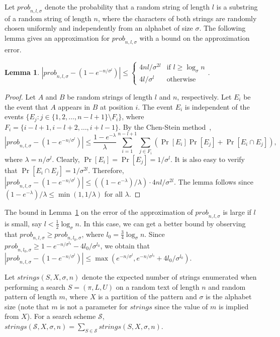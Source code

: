 \documentclass[12pt]{article}
\newtheorem{lemma}[theorem]{Lemma}
\newcommand{\scheme}{\mathcal{S}}
\newcommand{\partition}{X}
\newcommand{\numstrings}{\mathit{strings}}
\newcommand{\prob}[2]{\mathit{prob}_{#1,#2,\sigma}}
\begin{document}
Let $\prob{n}{l}$ denote the probability that a random string of length $l$
is a substring of a random string of length $n$, where the characters
of both strings are randomly chosen uniformly and independently
from an alphabet of size $\sigma$.
The following lemma gives an approximation for $\prob{n}{l}$ with
a bound on the approximation error.
\begin{lemma}\label{lem:substring-probability}
$|\prob{n}{l} - (1-e^{-n/\sigma^l})| \leq
\begin{cases}
 4nl/\sigma^{2l} & \text{if }l \geq \log_{\sigma} n \\
4l/\sigma^l & \text{otherwise}
\end{cases}$.
\end{lemma}
\begin{proof}
Let $A$ and $B$ be random strings of length $l$ and $n$, respectively.
Let $E_i$ be the event that $A$ appears in $B$ at position $i$.
The event $E_i$ is independent of the events
$\{E_j: j \in \{1,2,\ldots,n-l+1\} \setminus F_i\}$, where
$F_i =\{i-l+1,i-l+2,\ldots,i+l-1 \}$.
By the Chen-Stein method~\cite{Chen75,Barbour92},
\[
\left|\prob{n}{l} - (1-e^{-n/\sigma^l})\right| \leq
\frac{1-e^{-\lambda}}{\lambda}
\sum_{i=1}^{n-l+1} \sum_{j\in F_i} (\Pr[E_i]\Pr[E_j]+\Pr[E_i \cap E_j]),
\]
where $\lambda = n/\sigma^l$.
Clearly, $\Pr[E_i] = \Pr[E_j] = 1/\sigma^l$.
It is also easy to verify that $\Pr[E_i \cap E_j] = 1/\sigma^{2l}$.
Therefore,
$|\prob{n}{l} - (1-e^{-n/\sigma^l})| \leq
((1-e^{-\lambda})/\lambda) \cdot 4nl/\sigma^{2l}$.
The lemma follows since $(1-e^{-\lambda})/\lambda \leq \min(1,1/\lambda)$ 
for all $\lambda$.
\end{proof}
The bound in Lemma~\ref{lem:substring-probability} on the error of the
approximation of $\prob{n}{l}$ is large if $l$ is small,
say $l < \frac{1}{2}\log_{\sigma} n$.
In this case, we can get a better bound by observing that
$\prob{n}{l} \geq \prob{n}{l_0}$, where $l_0 = \frac{3}{4} \log_{\sigma} n$.
Since $\prob{n}{l_0} \geq 1-e^{-n/\sigma^{l_0}} - 4l_0/\sigma^{l_0}$,
we obtain that $|\prob{n}{l} - (1-e^{-n/\sigma^l}) | \leq
\max(e^{-n/\sigma^l},e^{-n/\sigma^{l_0}} + 4 l_0/\sigma^{l_0})$.

Let $\numstrings(S,\partition,\sigma,n)$ denote the expected number of strings
enumerated when performing a search $S=(\pi,L,U)$ on a random
text of length $n$ and random pattern of length $m$, where
$\partition$ is a partition of the pattern and
$\sigma$ is the alphabet size 
(note that $m$ is not a parameter for $\numstrings$ since the value
of $m$ is implied from $\partition$).
For a search scheme $\scheme$, $\numstrings(\scheme,\partition,\sigma,n) =
\sum_{S\in \scheme} \numstrings(S,\partition,\sigma,n)$.
\end{document}
